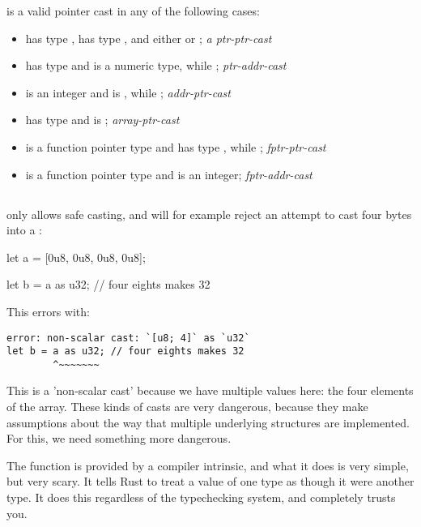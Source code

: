  is a valid pointer cast in any of the following cases:

\begin{itemize}
  \item{ has type ,  has type , and either  or ; 
      \emph{a ptr-ptr-cast}}
  \item{ has type  and  is a numeric type, while ; \emph{ptr-addr-cast}}
  \item{ is an integer and  is , while ; \emph{addr-ptr-cast}}
  \item{ has type \code{\&[T; n]} and  is ; \emph{array-ptr-cast}}
  \item{ is a function pointer type and  has type , while ; \emph{fptr-ptr-cast}}
  \item{ is a function pointer type and  is an integer; \emph{fptr-addr-cast}}
\end{itemize}

\subsection*{}

 only allows safe casting, and will for example reject an attempt to cast four bytes into a :

\begin{rustc}
let a = [0u8, 0u8, 0u8, 0u8];

let b = a as u32; // four eights makes 32
\end{rustc}

This errors with:

\begin{verbatim}
error: non-scalar cast: `[u8; 4]` as `u32`
let b = a as u32; // four eights makes 32
        ^~~~~~~~
\end{verbatim}

This is a 'non-scalar cast' because we have multiple values here: the four elements of the array. These kinds of casts are very 
dangerous, because they make assumptions about the way that multiple underlying structures are implemented. For this, we need 
something more dangerous.

\blank

The  function is provided by a compiler intrinsic, and what it does is very simple, but very scary. It tells Rust 
to treat a value of one type as though it were another type. It does this regardless of the typechecking system, and completely 
trusts you.

